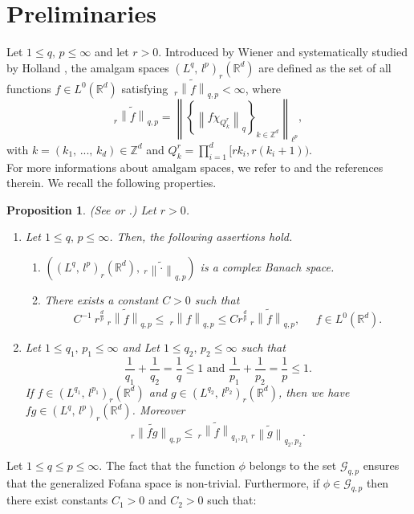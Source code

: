 \documentclass[10pt,a4paper]{amsart}
\numberwithin{equation}{section}
\newtheorem{proposition}[theorem]{Proposition}
\numberwithin{equation}{section}
\begin{document}
\section{Preliminaries}
\label{S2}
 Let $1\leq q,\, p \leq\infty$ and let $r>0$. Introduced by Wiener \cite{W} and systematically studied by Holland \cite{FH}, the amalgam spaces $(L^{q},\, l^{p})_{r}(\mathbb{R}^{d})$ are defined as the set of all functions $f \in L^{0}(\mathbb{R}^{d})$ satisfying $ \: _{r}\widetilde{\left\|f\right\|}_{q,p}<\infty$, where 
 $$_{r}\widetilde{\left\|f\right\|}_{q,p}= \left\|\left\{  \left\|f\chi_{Q^{r}_{k}}\right\|_{q} \right\}_{k \in \mathbb{Z}^{d} }\right\|_{\ell^{p}},  $$
with $k=(k_{1},\, ...,\,k_{d})\in \mathbb{Z}^{d}$ and
 $ Q^{r}_{k} = \prod_{i=1}^{d}  [rk_{i}, r(k_{i}+1)) $.\\
For more informations about amalgam spaces, we refer to \cite{FS2} and the references therein. We recall the following properties. 
 \begin{proposition} 
 \label{prop 3} (See \cite{FH} or  \cite{FS2}.)
Let $r>0$.
\begin{enumerate} 
\item Let $1\leq q,\, p \leq\infty$. Then, the following assertions
hold.
\begin{enumerate}
\item  $((L^{q},\, l^{p})_{r}(\mathbb{R}^{d}),   \: _{r}\widetilde{\left\|\cdot  \right\|}_{q,p}) $ is a complex Banach space.
\item  There exists a constant $ C>0 $ such that
$$C^{-1}\:r^{\frac{d}{p}}\:_{r}\widetilde{\left\|f\right\|}_{q,p}\leq \: _{r}\left\|f\right\|_{q,p} \leq C r^{\frac{d}{p}}\:_{r}\widetilde{\left\|f\right\|}_{q,p},\;\;\;\;\; f \in L^{0}(\mathbb{R}^{d}).$$
\end{enumerate}
\item Let $1\leq q_1,\, p_1 \leq \infty$ and Let $1\leq q_2,\, p_2 \leq \infty$ such that
$$\frac{1}{q_1}+ \frac{1}{q_2}=\frac{1}{q} \leq 1 \text{ and }  \frac{1}{p_1}+ \frac{1}{p_2}=\frac{1}{p} \leq 1. $$
If $f \in (L^{q_1},\, l^{p_1})_{r}(\mathbb{R}^{d})$ and $g \in (L^{q_2},\, l^{p_2})_{r}(\mathbb{R}^{d})$, then we have $fg \in (L^{q},\, l^{p})_{r}(\mathbb{R}^{d})$. Moreover
$$ _{r}\widetilde{\left\|fg\right\|}_{q,p}\leq \,  _{r}\widetilde{\left\|f\right\|}_{q_1,p_1}\, _{r}\widetilde{\left\|g\right\|}_{q_2,p_2}.$$
\end{enumerate}
 \end{proposition} 
Let $1\leq q \leq p\leq \infty$. The fact that the function $\phi$ belongs to the set $\mathcal{G}_{q,p}$ ensures that the generalized Fofana space  is non-trivial. Furthermore, if $\phi \in \mathcal{G}_{q,p}$ then there exist constants $C_1>0$ and $C_2>0$ such that:
\end{document}
